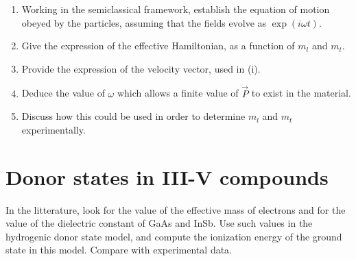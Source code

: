 \begin{enumerate}[label=(\roman*)]
\item Working in the semiclassical framework, establish the equation
  of motion obeyed by the particles, assuming that the fields evolve
  as $\exp{(i\omega t)}$.
\item Give the expression of the effective Hamiltonian, as a function
  of $m_l$ and $m_t$.
\item Provide the expression of the velocity vector, used in (i).
\item Deduce the value of $\omega$ which allows a finite value of
  $\vec{P}$ to exist in the material.
\item Discuss how this could be used in order to determine $m_l$ and
  $m_t$ experimentally.
\end{enumerate}

\section{Donor states in III-V compounds}

In the litterature, look for the value of the effective mass of electrons and for the
value of the
dielectric constant of GaAs and InSb. Use such values in
the hydrogenic donor state model, and compute the ionization energy of
the ground state in this model. Compare with experimental data.


